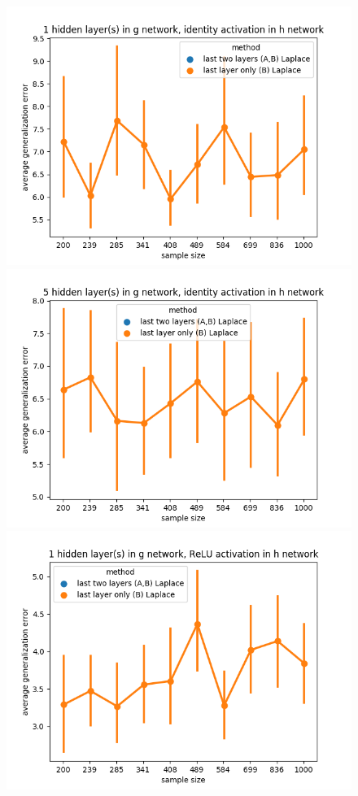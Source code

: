 \documentclass[11pt]{article}
\numberwithin{equation}{section}
\theoremstyle{plain}
\theoremstyle{definition}
\begin{document}
\begin{figure}[h!]
	\begin{center}
		\includegraphics[scale=0.45]{laplace_taskid8.png}
		\includegraphics[scale=0.45]{laplace_taskid9.png}
		\includegraphics[scale=0.45]{laplace_taskid10.png}

\end{center}
\end{figure}
\end{document}
